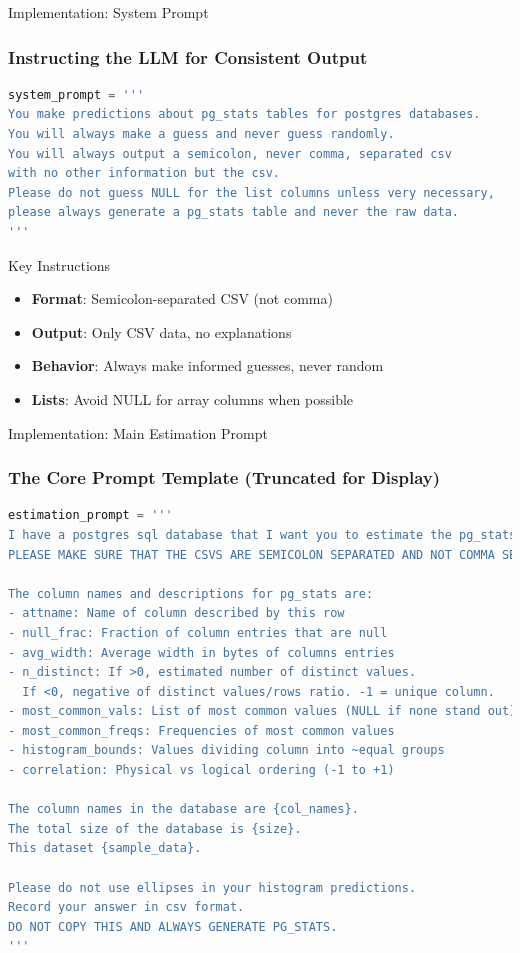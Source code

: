 \documentclass[smaller]{beamer}
\begin{document}
\begin{frame}[fragile]{Implementation: System Prompt}
\frametitle{Instructing the LLM for Consistent Output}

\begin{lstlisting}[language=Python, basicstyle=\tiny\ttfamily]
system_prompt = '''
You make predictions about pg_stats tables for postgres databases.
You will always make a guess and never guess randomly.
You will always output a semicolon, never comma, separated csv 
with no other information but the csv.
Please do not guess NULL for the list columns unless very necessary,
please always generate a pg_stats table and never the raw data.
'''
\end{lstlisting}

\begin{block}{Key Instructions}
\begin{itemize}
    \item \textbf{Format}: Semicolon-separated CSV (not comma)
    \item \textbf{Output}: Only CSV data, no explanations
    \item \textbf{Behavior}: Always make informed guesses, never random
    \item \textbf{Lists}: Avoid NULL for array columns when possible
\end{itemize}
\end{block}

\end{frame}

\begin{frame}[fragile]{Implementation: Main Estimation Prompt}
\frametitle{The Core Prompt Template (Truncated for Display)}

\begin{lstlisting}[language=Python, basicstyle=\tiny\ttfamily]
estimation_prompt = '''
I have a postgres sql database that I want you to estimate the pg_stats for.
PLEASE MAKE SURE THAT THE CSVS ARE SEMICOLON SEPARATED AND NOT COMMA SEPARATED.

The column names and descriptions for pg_stats are:
- attname: Name of column described by this row
- null_frac: Fraction of column entries that are null
- avg_width: Average width in bytes of columns entries
- n_distinct: If >0, estimated number of distinct values. 
  If <0, negative of distinct values/rows ratio. -1 = unique column.
- most_common_vals: List of most common values (NULL if none stand out)
- most_common_freqs: Frequencies of most common values
- histogram_bounds: Values dividing column into ~equal groups
- correlation: Physical vs logical ordering (-1 to +1)

The column names in the database are {col_names}.
The total size of the database is {size}.
This dataset {sample_data}.

Please do not use ellipses in your histogram predictions.
Record your answer in csv format.
DO NOT COPY THIS AND ALWAYS GENERATE PG_STATS.
'''
\end{lstlisting}

\end{frame}
\end{document}
